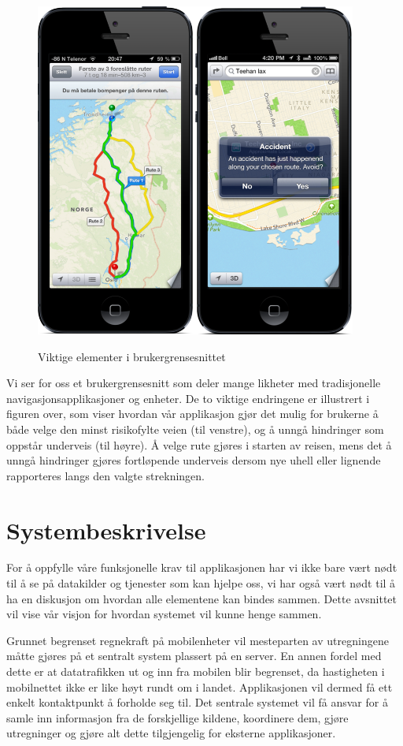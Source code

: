 \documentclass[a4paper,norsk,oneside]{book}
\begin{document}
\begin{figure}[H]
\centering
\includegraphics[scale=0.5]{figs/appconcept.png}
\label{fig:appconcept}
\caption{Viktige elementer i brukergrensesnittet}
\end{figure}

Vi ser for oss et brukergrensesnitt som deler mange likheter med tradisjonelle navigasjonsapplikasjoner og enheter. De to viktige endringene er illustrert i figuren over, som viser hvordan vår applikasjon gjør det mulig for brukerne å både velge den minst risikofylte veien (til venstre), og å unngå hindringer som oppstår underveis (til høyre). Å velge rute gjøres i starten av reisen, mens det å unngå hindringer gjøres fortløpende underveis dersom nye uhell eller lignende rapporteres langs den valgte strekningen.

\section{Systembeskrivelse}
\label{sec:Systembeskrivelse}

For å oppfylle våre funksjonelle krav til applikasjonen har vi ikke bare vært nødt til å se på datakilder og tjenester som kan hjelpe oss, vi har også vært nødt til å ha en diskusjon om hvordan alle elementene kan bindes sammen. Dette avsnittet vil vise vår visjon for hvordan systemet vil kunne henge sammen.

Grunnet begrenset regnekraft på mobilenheter vil mesteparten av utregningene måtte gjøres på et sentralt system plassert på en server. En annen fordel med dette er at datatrafikken ut og inn fra mobilen blir begrenset, da hastigheten i mobilnettet ikke er like høyt rundt om i landet. Applikasjonen vil dermed få ett enkelt kontaktpunkt å forholde seg til. Det sentrale systemet vil få ansvar for å samle inn informasjon fra de forskjellige kildene, koordinere dem, gjøre utregninger og gjøre alt dette tilgjengelig for eksterne applikasjoner.
\end{document}
